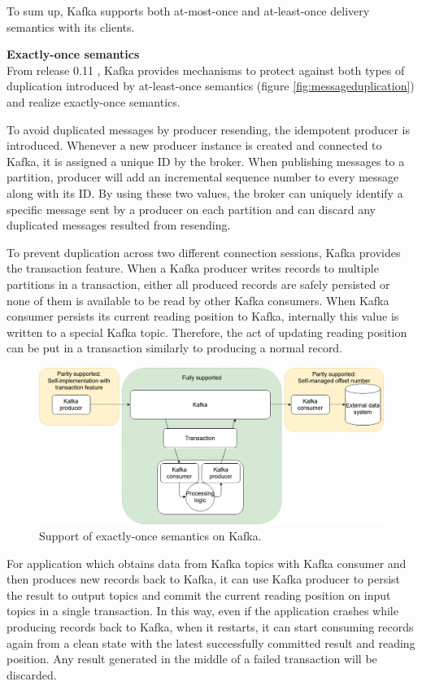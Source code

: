 To sum up, Kafka supports both at-most-once and at-least-once delivery semantics with its clients.

\textbf{Exactly-once semantics}\\
From release 0.11 \cite{kafkatransaction}, Kafka provides mechanisms to protect against both types of duplication introduced by at-least-once semantics (figure \ref{fig:messageduplication}) and realize exactly-once semantics. 

To avoid duplicated messages by producer resending, the idempotent producer is introduced. Whenever a new producer instance is created and connected to Kafka, it is assigned a unique ID by the broker. When publishing messages to a partition, producer will add an incremental sequence number to every message along with its ID. By using these two values, the broker can uniquely identify a specific message sent by a producer on each partition and can discard any duplicated messages resulted from resending. 

To prevent duplication across two different connection sessions, Kafka provides the transaction feature. When a Kafka producer writes records to multiple partitions in a transaction, either all produced records are safely persisted or none of them is available to be read by other Kafka consumers. When Kafka consumer persists its current reading position to Kafka, internally this value is written to a special Kafka topic. Therefore, the act of updating reading position can be put in a transaction similarly to producing a normal record.

\begin{figure}[h]
	\centering
	\includegraphics[width=\linewidth]{images/exactly-once-kafka.png}
	\caption{Support of exactly-once semantics on Kafka.}
	\label{fig:exactlyoncekafka}
\end{figure}


For application which obtains data from Kafka topics with Kafka consumer and then produces new records back to Kafka, it can use Kafka producer to persist the result to output topics and commit the current reading position on input topics in a single transaction. In this way, even if the application crashes while producing records back to Kafka, when it restarts, it can start consuming records again from a clean state with the latest successfully committed result and reading position. Any result generated in the middle of a failed transaction will be discarded. 

